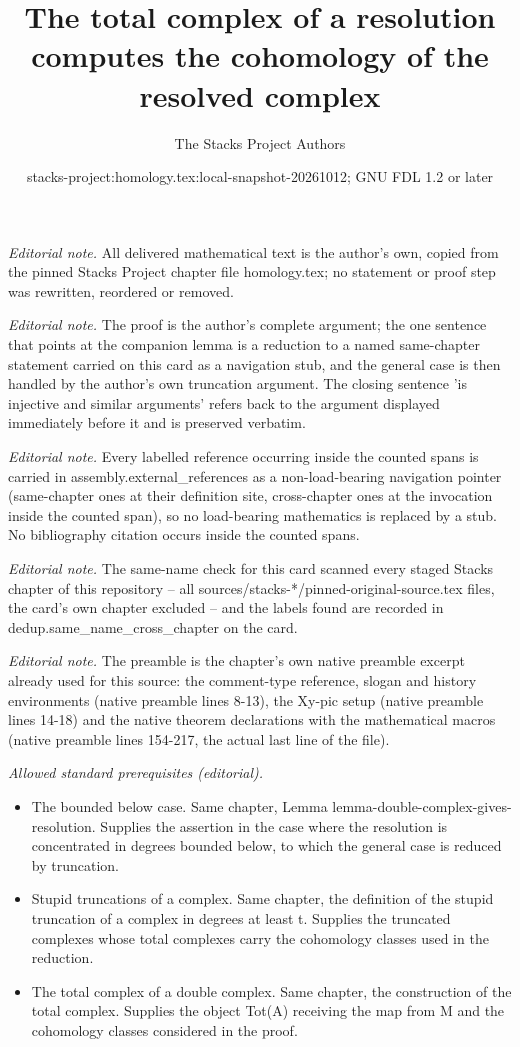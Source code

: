 \documentclass[10pt,a4paper]{amsart}
\title{The total complex of a resolution computes the cohomology of the resolved complex}
\author{The Stacks Project Authors}
\date{stacks-project:homology.tex:local-snapshot-20261012; GNU FDL 1.2 or later}
\theoremstyle{plain}
\theoremstyle{definition}
\theoremstyle{remark}
\numberwithin{equation}{subsection}
\begin{document}
\maketitle
\noindent\textit{Editorial note.} All delivered mathematical text is the author's own, copied from the pinned Stacks Project chapter file homology.tex; no statement or proof step was rewritten, reordered or removed.\par\medskip
\noindent\textit{Editorial note.} The proof is the author's complete argument; the one sentence that points at the companion lemma is a reduction to a named same-chapter statement carried on this card as a navigation stub, and the general case is then handled by the author's own truncation argument. The closing sentence 'is injective and similar arguments' refers back to the argument displayed immediately before it and is preserved verbatim.\par\medskip
\noindent\textit{Editorial note.} Every labelled reference occurring inside the counted spans is carried in assembly.external\_references as a non-load-bearing navigation pointer (same-chapter ones at their definition site, cross-chapter ones at the invocation inside the counted span), so no load-bearing mathematics is replaced by a stub. No bibliography citation occurs inside the counted spans.\par\medskip
\noindent\textit{Editorial note.} The same-name check for this card scanned every staged Stacks chapter of this repository -- all sources/stacks-*/pinned-original-source.tex files, the card's own chapter excluded -- and the labels found are recorded in dedup.same\_name\_cross\_chapter on the card.\par\medskip
\noindent\textit{Editorial note.} The preamble is the chapter's own native preamble excerpt already used for this source: the comment-type reference, slogan and history environments (native preamble lines 8-13), the Xy-pic setup (native preamble lines 14-18) and the native theorem declarations with the mathematical macros (native preamble lines 154-217, the actual last line of the file).\par\medskip
\noindent\textit{Allowed standard prerequisites (editorial).}\begin{itemize}
\item The bounded below case. Same chapter, Lemma lemma-double-complex-gives-resolution. Supplies the assertion in the case where the resolution is concentrated in degrees bounded below, to which the general case is reduced by truncation.
\item Stupid truncations of a complex. Same chapter, the definition of the stupid truncation of a complex in degrees at least t. Supplies the truncated complexes whose total complexes carry the cohomology classes used in the reduction.
\item The total complex of a double complex. Same chapter, the construction of the total complex. Supplies the object Tot(A) receiving the map from M and the cohomology classes considered in the proof.
\end{itemize}\medskip
\end{document}
